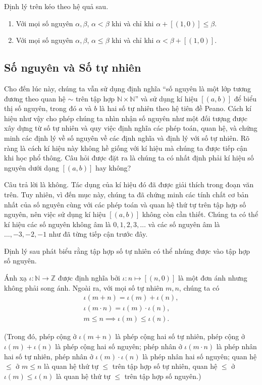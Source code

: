 Định lý trên kéo theo hệ quả sau.
\begin{corollary}
	\begin{enumerate}
		\item Với mọi số nguyên $\alpha, \beta$, $\alpha < \beta$ khi và chỉ khi $\alpha + [(1, 0)]\leq \beta$.
		\item Với mọi số nguyên $\alpha, \beta$, $\alpha\leq \beta$ khi và chỉ khi $\alpha < \beta + [(1,0)]$.
	\end{enumerate}
\end{corollary}

\subsection{Số nguyên và Số tự nhiên}

Cho đến lúc này, chúng ta vẫn sử dụng định nghĩa ``số nguyên là một lớp tương đương theo quan hệ $\sim$ trên tập hợp $\mathbb{N}\times\mathbb{N}$'' và sử dụng kí hiệu $[(a, b)]$ để biểu thị số nguyên, trong đó $a$ và $b$ là hai số tự nhiên theo hệ tiên đề Peano. Cách kí hiệu như vậy cho phép chúng ta nhìn nhận số nguyên như một đối tượng được xây dựng từ số tự nhiên và quy việc định nghĩa các phép toán, quan hệ, và chứng minh các định lý về số nguyên về các định nghĩa và định lý với số tự nhiên. Rõ ràng là cách kí hiệu này không hề giống với kí hiệu mà chúng ta được tiếp cận khi học phổ thông. Câu hỏi được đặt ra là chúng ta có nhất định phải kí hiệu số nguyên dưới dạng $[(a, b)]$ hay không?

Câu trả lời là không. Tác dụng của kí hiệu đó đã được giải thích trong đoạn văn trên. Tuy nhiên, vì đến mục này, chúng ta đã chứng minh các tính chất cơ bản nhất của số nguyên cùng với các phép toán và quan hệ thứ tự trên tập hợp số nguyên, nên việc sử dụng kí hiệu $[(a, b)]$ không còn cần thiết. Chúng ta có thể kí hiệu các số nguyên không âm là $0, 1, 2, 3,\ldots$ và các số nguyên âm là $\ldots, -3, -2, -1$ như đã từng tiếp cận trước đây.

Định lý sau phát biểu rằng tập hợp số tự nhiên có thể nhúng được vào tập hợp số nguyên.
\begin{theorem}\label{theorem:embed-N-into-Z}
	Ánh xạ $\iota: \mathbb{N}\to \mathbb{Z}$ được định nghĩa bởi $\iota: n\mapsto [(n, 0)]$ là một đơn ánh nhưng không phải song ánh. Ngoài ra, với mọi số tự nhiên $m, n$, chúng ta có
	\[
		\begin{split}
			\iota(m + n) = \iota(m) + \iota(n), \\
			\iota(m\cdot n) = \iota(m)\cdot\iota(n), \\
			m\leq n \implies \iota(m)\leq \iota(n).
		\end{split}
	\]

	(Trong đó, phép cộng ở $\iota(m + n)$ là phép cộng hai số tự nhiên, phép cộng ở $\iota(m) + \iota(n)$ là phép cộng hai số nguyên; phép nhân ở $\iota(m\cdot n)$ là phép nhân hai số tự nhiên, phép nhân ở $\iota(m)\cdot\iota(n)$ là phép nhân hai số nguyên; quan hệ $\leq$ ở $m\leq n$ là quan hệ thứ tự $\leq$ trên tập hợp số tự nhiên, quan hệ $\leq$ ở $\iota(m)\leq \iota(n)$ là quan hệ thứ tự $\leq$ trên tập hợp số nguyên.)
\end{theorem}

